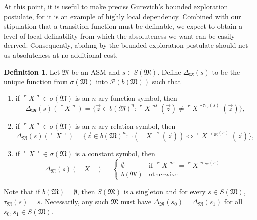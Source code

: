 \documentclass[12pt, twoside]{memoir}
\numberwithin{equation}{section}
\theoremstyle{definition}
\newtheorem{defi}[thm]{Definition}
\theoremstyle{remark}
\theoremstyle{definition}
\theoremstyle{definition}
\theoremstyle{definition}
\theoremstyle{remark}
\begin{document}
At this point, it is useful to make precise Gurevich's bounded exploration postulate, for it is an example of highly local dependency. Combined with our stipulation that a transition function must be definable, we expect to obtain a level of local definability from which the absoluteness we want can be easily derived. Consequently, abiding by the bounded exploration postulate should net us absoluteness at no additional cost.

\begin{defi}
Let $\mathfrak{M}$ be an ASM and $s \in S(\mathfrak{M})$. Define $\Delta_{\mathfrak{M}}(s)$ to be the unique function from $\sigma(\mathfrak{M})$ into $\mathcal{P}(b(\mathfrak{M}))$ such that
\begin{enumerate}[label=(\alph*)]
    \item if $\ulcorner X \urcorner \in \sigma(\mathfrak{M})$ is an $n$-ary function symbol, then 
    \begin{equation*}
        \Delta_{\mathfrak{M}}(s)(\ulcorner X \urcorner) = \{\Vec{z} \in b(\mathfrak{M})^n : \ulcorner X \urcorner^{s}(\Vec{z}) \neq \ulcorner X \urcorner^{\tau_{\mathfrak{M}}(s)}(\Vec{z})\} \text{,}
    \end{equation*}
    \item if $\ulcorner X \urcorner \in \sigma(\mathfrak{M})$ is an $n$-ary relation symbol, then 
    \begin{equation*}
        \Delta_{\mathfrak{M}}(s)(\ulcorner X \urcorner) = \{\Vec{z} \in b(\mathfrak{M})^n : \neg (\ulcorner X \urcorner^{s}(\Vec{z})) \iff \ulcorner X \urcorner^{\tau_{\mathfrak{M}}(s)}(\Vec{z})\} \text{,}
    \end{equation*}
    \item if $\ulcorner X \urcorner \in \sigma(\mathfrak{M})$ is a constant symbol, then 
    \begin{equation*}
        \Delta_{\mathfrak{M}}(s)(\ulcorner X \urcorner) =
        \begin{cases}
            \emptyset & \text{if } \ulcorner X \urcorner^{s} = \ulcorner X \urcorner^{\tau_{\mathfrak{M}}(s)} \\
            b(\mathfrak{M}) & \text{otherwise.}
        \end{cases}
    \end{equation*}
\end{enumerate}
Note that if $b(\mathfrak{M}) = \emptyset$, then $S(\mathfrak{M})$ is a singleton and for every $s \in S(\mathfrak{M})$, $\tau_{\mathfrak{M}}(s) = s$. Necessarily, any such $\mathfrak{M}$ must have $\Delta_{\mathfrak{M}}(s_0) = \Delta_{\mathfrak{M}}(s_1)$ for all $s_0, s_1 \in S(\mathfrak{M})$.
\end{defi}
\end{document}
